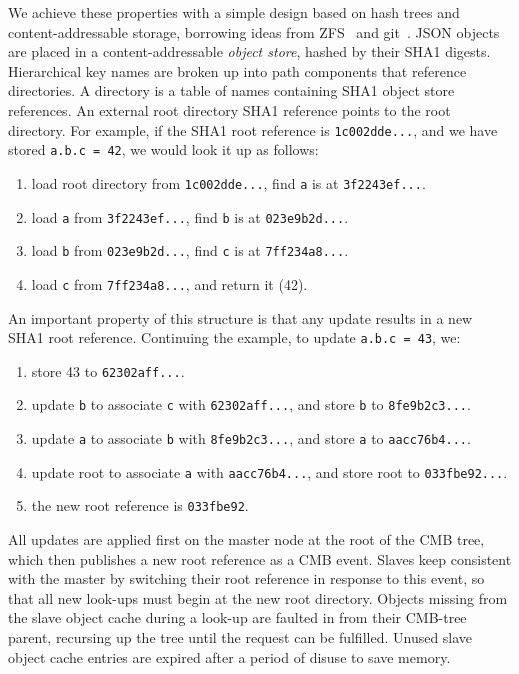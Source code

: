 We achieve these properties with a simple design based on hash trees
and content-addressable storage, borrowing ideas from
ZFS~\cite{Bonwick03thezettabyte} and git~\cite{Chacon:2009:PG:1618548}.
JSON objects are placed in a content-addressable
{\em object store}, hashed by their SHA1 digests.
Hierarchical key names are broken up into path components that reference
directories.
A directory is a table of names containing SHA1 object store references.
An external root directory SHA1 reference points to the root directory.
For example, if the SHA1 root reference is {\tt 1c002dde...}, and we have
stored {\tt a.b.c = 42}, we would look it up as follows:
\begin{enumerate}
\item{load root directory from {\tt 1c002dde...}, find {\tt a} is at
{\tt 3f2243ef...}.}
\item{load {\tt a} from {\tt 3f2243ef...}, find {\tt b} is at
{\tt 023e9b2d...}.}
\item{load {\tt b} from {\tt 023e9b2d...}, find {\tt c} is at
{\tt 7ff234a8...}.}
\item{load {\tt c} from {\tt 7ff234a8...}, and return it (42).}
\end{enumerate}

An important property of this structure is that any update results
in a new SHA1 root reference.  Continuing the example, to update {\tt a.b.c = 43}, we:
\begin{enumerate}
\item{store 43 to {\tt 62302aff...}.}
\item{update {\tt b} to associate {\tt c} with {\tt 62302aff...}, and store {\tt b} to {\tt 8fe9b2c3...}.}
\item{update {\tt a} to associate {\tt b} with {\tt 8fe9b2c3...}, and store {\tt a} to {\tt aacc76b4...}.}
\item{update root to associate {\tt a} with {\tt aacc76b4...}, and store root to {\tt 033fbe92...}.}
\item{the new root reference is {\tt 033fbe92}.}
\end{enumerate}


All updates are applied first on the master node at the root of the
CMB tree, which then publishes a new root reference as a CMB event.
Slaves keep consistent with the master by switching their root reference
in response to this event, so that all new look-ups must begin at the
new root directory.  Objects missing from the slave object cache during
a look-up are faulted in from their CMB-tree parent, recursing up the tree
until the request can be fulfilled.  Unused slave object cache entries are
expired after a period of disuse to save memory.

